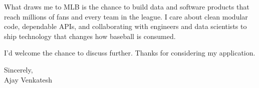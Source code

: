\documentclass[letterpaper,11pt]{article}
\begin{document}
What draws me to MLB is the chance to build data and software products that reach millions of fans and every team in the league. I care about clean modular code, dependable APIs, and collaborating with engineers and data scientists to ship technology that changes how baseball is consumed.

I'd welcome the chance to discuss further. Thanks for considering my application.

\vspace{12pt}
Sincerely, \\
Ajay Venkatesh
\end{document}
